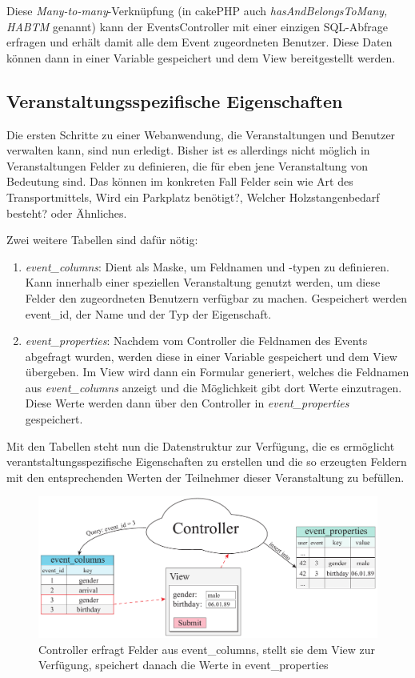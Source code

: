 Diese \emph{Many-to-many}-Verknüpfung (in cakePHP auch \emph{hasAndBelongsToMany, HABTM} genannt) kann der EventsController mit einer einzigen SQL-Abfrage erfragen und erhält damit alle dem Event zugeordneten Benutzer. Diese Daten können dann in einer Variable gespeichert und dem View bereitgestellt werden.

\subsection{Veranstaltungsspezifische Eigenschaften}
Die ersten Schritte zu einer Webanwendung, die Veranstaltungen und Benutzer verwalten kann, sind nun erledigt. Bisher ist es allerdings nicht möglich in Veranstaltungen Felder zu definieren, die für eben jene Veranstaltung von Bedeutung sind. Das können im konkreten Fall Felder sein wie \glqq Art des Transportmittels\grqq{}, \glqq Wird ein Parkplatz benötigt?\grqq{}, \glqq Welcher Holzstangenbedarf besteht?\grqq{} oder Ähnliches.\par

Zwei weitere Tabellen sind dafür nötig: 

\begin{enumerate} 
	\item \emph{event\_columns}: Dient als Maske, um Feldnamen und -typen zu definieren. Kann innerhalb einer speziellen Veranstaltung genutzt werden, um diese Felder den zugeordneten Benutzern verfügbar zu machen. Gespeichert werden event\_id, der Name und der Typ der Eigenschaft.

	\item \emph{event\_properties}: Nachdem vom Controller die Feldnamen des Events abgefragt wurden, werden diese in einer Variable gespeichert und dem View übergeben. Im View wird dann ein Formular generiert, welches die Feldnamen aus \emph{event\_columns} anzeigt und die Möglichkeit gibt dort Werte einzutragen. Diese Werte werden dann über den Controller in \emph{event\_properties} gespeichert.
\end{enumerate}

\newpage
Mit den Tabellen steht nun die Datenstruktur zur Verfügung, die es ermöglicht verantstaltungsspezifische Eigenschaften zu erstellen und die so erzeugten Feldern mit den entsprechenden Werten der Teilnehmer dieser Veranstaltung zu befüllen.

\begin{figure}[!ht]
	\centering
	\includegraphics[width=15cm]{fig/event_properties}
	\caption{Controller erfragt Felder aus event\_columns, stellt sie dem View zur Verfügung, speichert danach die Werte in event\_properties}
\end{figure}

